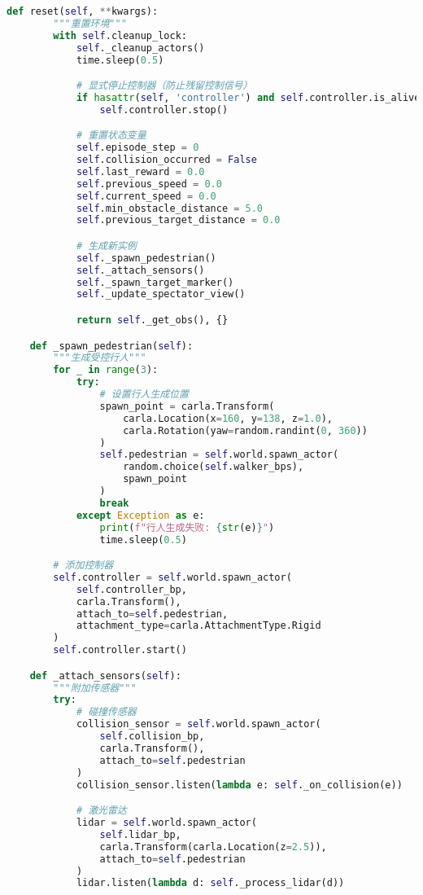 \begin{lstlisting}[language=Python]
    def reset(self, **kwargs):
        """重置环境"""
        with self.cleanup_lock:
            self._cleanup_actors()
            time.sleep(0.5)

            # 显式停止控制器（防止残留控制信号）
            if hasattr(self, 'controller') and self.controller.is_alive:
                self.controller.stop()

            # 重置状态变量
            self.episode_step = 0
            self.collision_occurred = False
            self.last_reward = 0.0
            self.previous_speed = 0.0
            self.current_speed = 0.0
            self.min_obstacle_distance = 5.0
            self.previous_target_distance = 0.0

            # 生成新实例
            self._spawn_pedestrian()
            self._attach_sensors()
            self._spawn_target_marker()
            self._update_spectator_view()

            return self._get_obs(), {}

    def _spawn_pedestrian(self):
        """生成受控行人"""
        for _ in range(3):
            try:
                # 设置行人生成位置
                spawn_point = carla.Transform(
                    carla.Location(x=160, y=138, z=1.0),
                    carla.Rotation(yaw=random.randint(0, 360))
                )
                self.pedestrian = self.world.spawn_actor(
                    random.choice(self.walker_bps),
                    spawn_point
                )
                break
            except Exception as e:
                print(f"行人生成失败: {str(e)}")
                time.sleep(0.5)

        # 添加控制器
        self.controller = self.world.spawn_actor(
            self.controller_bp,
            carla.Transform(),
            attach_to=self.pedestrian,
            attachment_type=carla.AttachmentType.Rigid
        )
        self.controller.start()

    def _attach_sensors(self):
        """附加传感器"""
        try:
            # 碰撞传感器
            collision_sensor = self.world.spawn_actor(
                self.collision_bp,
                carla.Transform(),
                attach_to=self.pedestrian
            )
            collision_sensor.listen(lambda e: self._on_collision(e))

            # 激光雷达
            lidar = self.world.spawn_actor(
                self.lidar_bp,
                carla.Transform(carla.Location(z=2.5)),
                attach_to=self.pedestrian
            )
            lidar.listen(lambda d: self._process_lidar(d))


\end{lstlisting}
